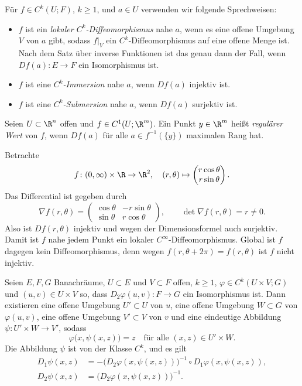 \documentclass[11pt]{article}
\begin{document}
Für $f \in C^k(U; F)$, $k \ge 1$, und $a \in U$ verwenden wir folgende Sprechweisen:
\begin{itemize}
  \item $f$ ist ein \emph{lokaler $C^k$-Diffeomorphismus} nahe $a$, wenn es eine offene Umgebung $V$ von $a$ gibt, sodass $f|_V$ ein $C^k$-Diffeomorphismus auf eine offene Menge ist. Nach dem Satz über inverse Funktionen ist das genau dann der Fall, wenn $Df(a)\colon E \to F$ ein Isomorphismus ist.
  \item $f$ ist eine \emph{$C^k$-Immersion} nahe $a$, wenn $Df(a)$ injektiv ist.
  \item $f$ ist eine \emph{$C^k$-Submersion} nahe $a$, wenn $Df(a)$ surjektiv ist.
\end{itemize}


\begin{definition}\Theorem
  Seien $U \subset \R^n$ offen und $f \in C^1(U; \R^m)$.
  Ein Punkt $y \in \R^m$ heißt \emph{regulärer Wert} von $f$, wenn $Df(a)$ für alle $a \in f^{-1}(\{y\})$ maximalen Rang hat.
\end{definition}


\begin{example}[Polarkoordinaten im $\R^2$]
  Betrachte
  \[
    f\colon (0, \infty) \times \R \to \R^2, \quad (r, \theta) \mapsto \begin{pmatrix} r \cos\theta \\ r \sin\theta \end{pmatrix}.
  \]
  Das Differential ist gegeben durch
  \[
    \nabla f(r, \theta) = \begin{pmatrix} \cos\theta & -r \sin\theta \\ \sin\theta & r \cos\theta \end{pmatrix}, \qquad \det \nabla f(r, \theta) = r \neq 0.
  \]
  Also ist $Df(r, \theta)$ injektiv und wegen der Dimensionsformel auch surjektiv. Damit ist $f$ nahe jedem Punkt ein lokaler $C^\infty$-Diffeomorphismus.
  Global ist $f$ dagegen kein Diffeomorphismus, denn wegen $f(r, \theta + 2\pi) = f(r, \theta)$ ist $f$ nicht injektiv.
\end{example}

\begin{theorem}\Theorem
  Seien $E, F, G$ Banachräume, $U \subset E$ und $V \subset F$ offen, $k \ge 1$, $\varphi \in C^k(U \times V; G)$ und $(u, v) \in U \times V$ so, dass $D_2 \varphi(u, v)\colon F \to G$ ein Isomorphismus ist.
  Dann existieren eine offene Umgebung $U' \subset U$ von $u$, eine offene Umgebung $W \subset G$ von $\varphi(u, v)$, eine offene Umgebung $V' \subset V$ von $v$ und eine eindeutige Abbildung $\psi\colon U' \times W \to V'$, sodass
  \[ \varphi\bigl(x, \psi(x, z)\bigr) = z \quad \text{für alle } (x, z) \in U' \times W. \]
  Die Abbildung $\psi$ ist von der Klasse $C^k$, und es gilt
  \begin{align*}
    D_1 \psi(x, z) &= -\bigl(D_2 \varphi(x, \psi(x, z))\bigr)^{-1} \circ D_1 \varphi(x, \psi(x, z)), \\
    D_2 \psi(x, z) &= \bigl(D_2 \varphi(x, \psi(x, z))\bigr)^{-1}.
  \end{align*}
\end{theorem}
\end{document}
